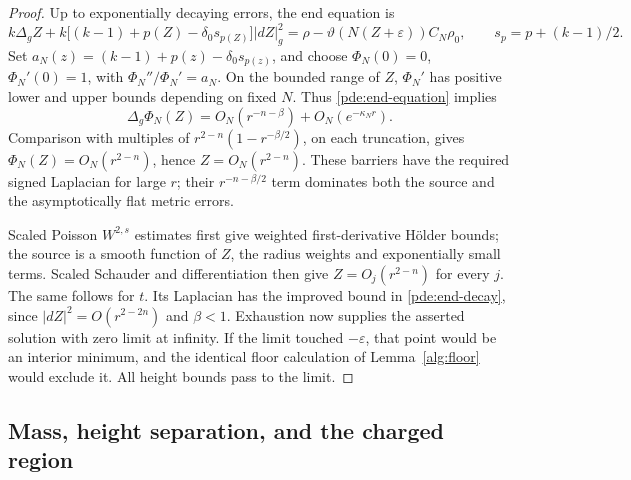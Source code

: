 \begin{proof}
Up to exponentially decaying errors, the end equation is
\begin{equation}
 k\Delta_gZ+
 k\big[(k-1)+p(Z)-\delta_0s_{p(Z)}\big]|dZ|_g^2
 =\rho-\vartheta(N(Z+\varepsilon))C_N\rho_0,
 \qquad s_p=p+(k-1)/2.
 \label{pde:end-equation}
\end{equation}
Set \(a_N(z)=(k-1)+p(z)-\delta_0s_{p(z)}\), and choose
\(\Phi_N(0)=0\), \(\Phi_N'(0)=1\), with
\(\Phi_N''/\Phi_N'=a_N\).
On the bounded range of \(Z\), \(\Phi_N'\) has positive lower and
upper bounds depending on fixed \(N\).  Thus \eqref{pde:end-equation}
implies
\[
 \Delta_g\Phi_N(Z)=O_N(r^{-n-\beta})+O_N(e^{-\kappa_Nr}).
\]
Comparison with multiples of
\(r^{2-n}(1-r^{-\beta/2})\), on each truncation, gives
\(\Phi_N(Z)=O_N(r^{2-n})\), hence \(Z=O_N(r^{2-n})\).
These barriers have the required signed Laplacian for large \(r\);
their \(r^{-n-\beta/2}\) term dominates both the source and the
asymptotically flat metric errors.

Scaled Poisson \(W^{2,s}\) estimates first give weighted first-derivative
H\"older bounds; the source is a smooth function of \(Z\), the radius
weights and exponentially small terms.  Scaled Schauder and
differentiation then give \(Z=O_j(r^{2-n})\) for every \(j\).
The same follows for \(t\).  Its Laplacian has the improved bound in
\eqref{pde:end-decay}, since \(|dZ|^2=O(r^{2-2n})\) and
\(\beta<1\).  Exhaustion now supplies the asserted solution with
zero limit at infinity.  If the limit touched \(-\varepsilon\), that
point would be an interior minimum, and the identical floor calculation
of Lemma~\ref{alg:floor} would exclude it.  All height bounds pass to
the limit.
\end{proof}

\subsection{Mass, height separation, and the charged region}


